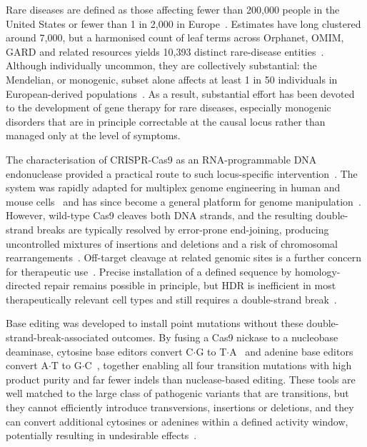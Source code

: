 \documentclass{article}
\begin{document}
Rare diseases are defined as those affecting fewer than 200{,}000 people in the United States or fewer than 1 in 2{,}000 in Europe~\cite{boycottInternationalCooperationEnable2017}.
Estimates have long clustered around 7{,}000, but a harmonised count of leaf terms across Orphanet, OMIM, GARD and related resources yields 10{,}393 distinct rare-disease entities~\cite{haendelHowManyRare2020}.
Although individually uncommon, they are collectively substantial: the Mendelian, or monogenic, subset alone affects at least 1 in 50 individuals in European-derived populations~\cite{boycottInternationalCooperationEnable2017}. As a result, substantial effort has been devoted to the development of gene therapy for rare diseases, especially monogenic disorders that are in principle correctable at the causal locus rather than managed only at the level of symptoms.

The characterisation of CRISPR-Cas9 as an RNA-programmable DNA endonuclease provided a practical route to such locus-specific intervention~\cite{jinekProgrammableDualRNAguided2012}.
The system was rapidly adapted for multiplex genome engineering in human and mouse cells~\cite{congMultiplexGenomeEngineering2013,maliRNAGuidedHumanGenome2013} and has since become a general platform for genome manipulation~\cite{doudnaNewFrontierGenome2014}.
However, wild-type Cas9 cleaves both DNA strands, and the resulting double-strand breaks are typically resolved by error-prone end-joining, producing uncontrolled mixtures of insertions and deletions and a risk of chromosomal rearrangements~\cite{anzaloneGenomeEditingCRISPR2020,schepImpactChromatinContext2021,anzaloneProgrammableDeletionReplacement2022}.
Off-target cleavage at related genomic sites is a further concern for therapeutic use~\cite{alkanCRISPRCas9OfftargetingAssessment2018}.
Precise installation of a defined sequence by homology-directed repair remains possible in principle, but HDR is inefficient in most therapeutically relevant cell types and still requires a double-strand break~\cite{anzaloneGenomeEditingCRISPR2020}.

Base editing was developed to install point mutations without these double-strand-break-associated outcomes.
By fusing a Cas9 nickase to a nucleobase deaminase, cytosine base editors convert C$\cdot$G to T$\cdot$A~\cite{komorProgrammableEditingTarget2016} and adenine base editors convert A$\cdot$T to G$\cdot$C~\cite{gaudelliProgrammableBaseEditing2017}, together enabling all four transition mutations with high product purity and far fewer indels than nuclease-based editing.
These tools are well matched to the large class of pathogenic variants that are transitions, but they cannot efficiently introduce transversions, insertions or deletions, and they can convert additional cytosines or adenines within a defined activity window, potentially resulting in undesirable effects~\cite{anzaloneGenomeEditingCRISPR2020,anzaloneSearchandreplaceGenomeEditing2019}.
\end{document}
